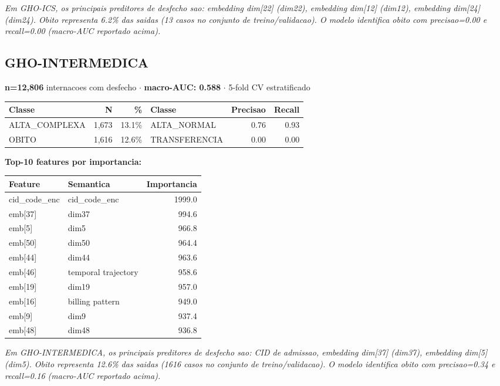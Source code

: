 \documentclass[11pt,a4paper]{article}
\begin{document}
\vspace{4pt}\noindent\textit{Em GHO-ICS, os principais preditores de desfecho sao: embedding dim[22] (dim22), embedding dim[12] (dim12), embedding dim[24] (dim24). Obito representa 6.2\% das saidas (13 casos no conjunto de treino/validacao). O modelo identifica obito com precisao=0.00 e recall=0.00 (macro-AUC reportado acima).}

\subsection{GHO-INTERMEDICA}
\textbf{n=12,806} internacoes com desfecho $\cdot$ \textbf{macro-AUC: 0.588} $\cdot$ 5-fold CV estratificado

\begin{tabular}{lrr|lrr}
\toprule
Classe & N & \% & Classe & Precisao & Recall \\
\midrule
ALTA\_COMPLEXA & 1,673 & 13.1\% & ALTA\_NORMAL & 0.76 & 0.93 \\
OBITO & 1,616 & 12.6\% & TRANSFERENCIA & 0.00 & 0.00 \\
\bottomrule
\end{tabular}

\vspace{4pt}\noindent\textbf{Top-10 features por importancia:}

\begin{tabular}{llr}
\toprule
Feature & Semantica & Importancia \\
\midrule
cid\_code\_enc & cid\_code\_enc & 1999.0 \\
emb[37] & dim37 & 994.6 \\
emb[5] & dim5 & 966.8 \\
emb[50] & dim50 & 964.4 \\
emb[44] & dim44 & 963.6 \\
emb[46] & temporal trajectory & 958.6 \\
emb[19] & dim19 & 957.0 \\
emb[16] & billing pattern & 949.0 \\
emb[9] & dim9 & 937.4 \\
emb[48] & dim48 & 936.8 \\
\bottomrule
\end{tabular}

\vspace{4pt}\noindent\textit{Em GHO-INTERMEDICA, os principais preditores de desfecho sao: CID de admissao, embedding dim[37] (dim37), embedding dim[5] (dim5). Obito representa 12.6\% das saidas (1616 casos no conjunto de treino/validacao). O modelo identifica obito com precisao=0.34 e recall=0.16 (macro-AUC reportado acima).}
\end{document}
